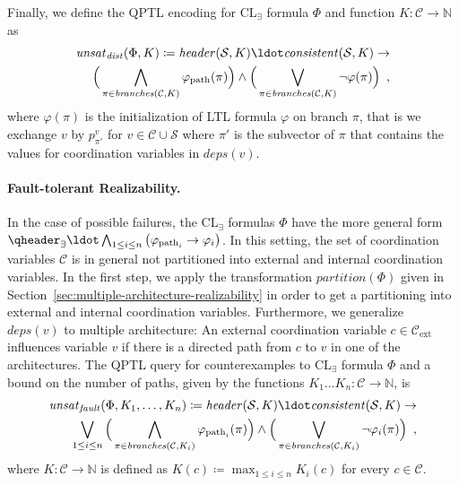 \documentclass{LMCS}
\newcommand{\deps}{\mathit{deps}}
\newcommand{\branches}{\mathit{branches}}
\newcommand{\header}{\mathit{header}}
\newcommand{\consistent}{\mathit{consistent}}
\newcommand{\unsatii}{\mathit{unsat}_\mathit{dist}}
\newcommand{\unsatnf}{\mathit{unsat}_\mathit{fault}}
\newcommand{\partition}{\mathit{partition}}
\theoremstyle{plain}\newtheorem{theorem}[thm]{Theorem}
\theoremstyle{plain}\newtheorem{lemma}[thm]{Lemma}
\theoremstyle{plain}\newtheorem{proposition}[thm]{Proposition}
\theoremstyle{plain}\newtheorem{corollary}[thm]{Corollary}
\theoremstyle{definition}\newtheorem{definition}{Definition}[section]
\begin{document}
Finally, we define the QPTL encoding for CL$_\exists$ formula $\Phi$ and function $K : \mathcal{C} \rightarrow \mathbb{N}$ as
\begin{align} \label{eq:incomplete_information_transformation}
  \unsatii(\Phi,K) \coloneqq
  \header(\mathcal{S}, K) \ldot
  \consistent(\mathcal{S},K) \rightarrow \nonumber \\
  \Big( \bigwedge_{\pi \in \branches(\mathcal{C},K)} \varphi_\text{path}(\pi) \Big) \land
  \Big( \bigvee_{\pi \in \branches(\mathcal{C},K)} \neg\varphi(\pi) \Big) \enspace,
\end{align}
where $\varphi(\pi)$ is the initialization of LTL formula $\varphi$ on branch $\pi$, that is we exchange $v$ by $p^v_{\pi'}$ for $v \in \mathcal{C} \cup \mathcal{S}$ where $\pi'$ is the subvector of $\pi$ that contains the values for coordination variables in $\deps(v)$.

\paragraph{\bf Fault-tolerant Realizability.} 
\label{sec:realizability_node_failures}


In the case of possible failures, the CL$_\exists$ formulas $\Phi$ have the more general form $\qheader_\exists \ldot\allowbreak \bigwedge_{1 \leq i \leq n} \big( \varphi_{\text{path}_i} \rightarrow \varphi_i \big)$.
In this setting, the set of coordination variables $\mathcal{C}$ is in general not partitioned into external and internal coordination variables.
In the first step, we apply the transformation $\partition(\Phi)$ given in Section~\ref{sec:multiple-architecture-realizability} in order to get a partitioning into external and internal coordination variables.
Furthermore, we generalize $\deps(v)$ to multiple architecture: An external coordination variable $c \in \mathcal{C}_\text{ext}$ influences variable $v$ if there is a directed path from $c$ to $v$ in one of the architectures.
The QPTL query for counterexamples to CL$_\exists$ formula $\Phi$ and a bound on the number of paths, given by the functions $K_1 \dots K_n : \mathcal{C} \rightarrow \mathbb{N}$, is
\begin{align} \label{eq:node_failure_transform}
  \unsatnf(\Phi,K_1,\dots,K_n) \coloneqq
  \header(\mathcal{S}, K) \ldot
  \consistent(\mathcal{S},K) \rightarrow \nonumber \\
  \bigvee_{1 \leq i \leq n}
  \Big( \bigwedge_{\pi \in \branches(\mathcal{C},K_i)} \varphi_{\text{path}_i}(\pi) \Big) \land
  \Big( \bigvee_{\pi \in \branches(\mathcal{C},K_i)} \neg\varphi_i(\pi) \Big) \enspace,
\end{align}
where $K : \mathcal{C} \rightarrow \mathbb{N}$ is defined as $K(c) \coloneqq \max_{1 \leq i \leq n} K_i(c)$ for every $c \in \mathcal{C}$.
\end{document}
